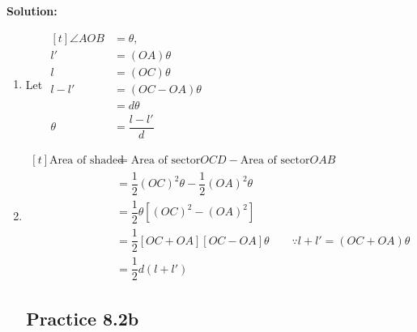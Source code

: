 \documentclass{report}
\newcommand{\sol}{\noindent\textbf{Solution:} }
\newcommand{\practice}[1]{%
    \subsection*{\faFlag\ \ Practice #1\hspace{0.5em}\xrfill[0.175\baselineskip]{1pt}}
}
\begin{document}
\begin{question}
    \sol{}
    \vspace{-1em}
    \begin{enumerate}[label=(\alph*)]
        \item Let $\begin{aligned}[t]
            \angle AOB &= \theta,\\
            l' &= (OA)\theta\\
            l &= (OC)\theta\\
            l - l' &= (OC - OA)\theta\\
            & = d\theta\\
            \theta &= \dfrac{l - l'}{d}
        \end{aligned}$
        
        \item $\begin{aligned}[t]
        \text{Area of shaded region} &= \text{Area of sector} OCD - \text{Area of sector} OAB\\
            & = \dfrac{1}{2}(OC)^2\theta - \dfrac{1}{2}(OA)^2\theta\\
            &= \dfrac{1}{2}\theta\left[(OC)^2 - (OA)^2\right]\\
            &= \dfrac{1}{2}\left[OC + OA\right]\left[OC - OA\right]\theta \qquad \because l + l' = (OC + OA)\theta\\
            & = \dfrac{1}{2}d(l + l')
        \end{aligned}$
    \end{enumerate}
\end{question}

\practice{8.2b}
\end{document}
